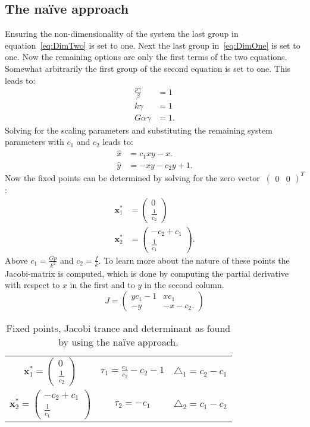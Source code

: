 \subsection{The na\"{i}ve approach}
Ensuring the non-dimensionality of the system the last group in equation~\ref{eq:DimTwo} is set to one. Next the last group in~\ref{eq:DimOne} is set to one. Now the remaining options are only the first terms of the two equations. Somewhat arbitrarily the first group of the second equation is set to one. This leads to:
\begin{align}
\frac{p\gamma}{\beta} &= 1 \\
k\gamma &= 1 \\
G\alpha\gamma &= 1.
\end{align}
Solving for the scaling parameters and substituting the remaining system parameters with $c_1$ and $c_2$ leads to:
\begin{align}
\hat{x} &= c_1 xy - x. \\
\hat{y} &= -xy -c_2 y + 1.
\end{align}
Now the fixed points can be determined by solving for the zero vector $\ \begin{pmatrix} 0 & 0 \end{pmatrix}^T$:
\begin{align}
\mathbf{x}^{*}_1 &= \begin{pmatrix} 0 \\ \frac{1}{c_2} \end{pmatrix} \\
\mathbf{x}^{*}_2 &= \begin{pmatrix} -c_2 + c_1 \\ \frac{1}{c_1} \end{pmatrix} .
\end{align}
Above $c_1 = \frac{Gp}{k^2}$ and $c_2 = \frac{f}{k}$.
To learn more about the nature of these points the Jacobi-matrix is computed, which is done by computing the partial derivative with respect to $x$ in the first and to $y$ in the second column. 
\begin{equation}
J =
\begin{pmatrix}
yc_1 - 1 & xc_1 \\
-y 		 &	-x - c_2 . 
\end{pmatrix}
\label{eq:Jacobi}
\end{equation}
\begin{table}
\centering
\begin{tabular}{|c|c|c|}
\hline
$\mathbf{x}_1^* = \begin{pmatrix} 0 \\ \frac{1}{c_2} \end{pmatrix}$
& $\tau_1 = \frac{c_1}{c_2} - c_2 - 1$ & $\triangle_1 = c_2 - c_1$ \\
$\mathbf{x}_2^* = \begin{pmatrix} -c_2 + c_1 \\ \frac{1}{c_1} \end{pmatrix}$
& $\tau_2 = -c_1$ 						& $\triangle_2 = c_1 - c_2$ \\
\hline
\end{tabular}
\caption{Fixed points, Jacobi trance and determinant as found by using the na\"{i}ve approach.}
\label{tab:naive}
\end{table}
